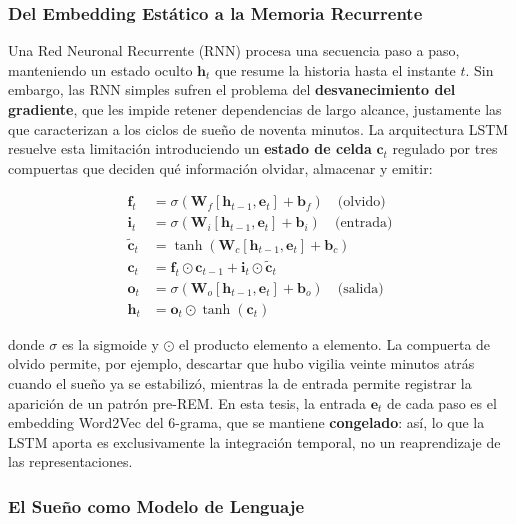 \subsubsection{Del Embedding Estático a la Memoria Recurrente}

Una Red Neuronal Recurrente (RNN) procesa una secuencia paso a paso, manteniendo un estado oculto $\mathbf{h}_t$ que resume la historia hasta el instante $t$. Sin embargo, las RNN simples sufren el problema del \textbf{desvanecimiento del gradiente}, que les impide retener dependencias de largo alcance, justamente las que caracterizan a los ciclos de sueño de noventa minutos. La arquitectura LSTM \cite{hochreiter1997long} resuelve esta limitación introduciendo un \textbf{estado de celda} $\mathbf{c}_t$ regulado por tres compuertas que deciden qué información olvidar, almacenar y emitir:

\begin{align}
    \mathbf{f}_t &= \sigma(\mathbf{W}_f [\mathbf{h}_{t-1}, \mathbf{e}_t] + \mathbf{b}_f) \quad \text{(olvido)} \\
    \mathbf{i}_t &= \sigma(\mathbf{W}_i [\mathbf{h}_{t-1}, \mathbf{e}_t] + \mathbf{b}_i) \quad \text{(entrada)} \\
    \tilde{\mathbf{c}}_t &= \tanh(\mathbf{W}_c [\mathbf{h}_{t-1}, \mathbf{e}_t] + \mathbf{b}_c) \\
    \mathbf{c}_t &= \mathbf{f}_t \odot \mathbf{c}_{t-1} + \mathbf{i}_t \odot \tilde{\mathbf{c}}_t \\
    \mathbf{o}_t &= \sigma(\mathbf{W}_o [\mathbf{h}_{t-1}, \mathbf{e}_t] + \mathbf{b}_o) \quad \text{(salida)} \\
    \mathbf{h}_t &= \mathbf{o}_t \odot \tanh(\mathbf{c}_t)
\end{align}

donde $\sigma$ es la sigmoide y $\odot$ el producto elemento a elemento. La compuerta de olvido permite, por ejemplo, descartar que hubo vigilia veinte minutos atrás cuando el sueño ya se estabilizó, mientras la de entrada permite registrar la aparición de un patrón pre-REM. En esta tesis, la entrada $\mathbf{e}_t$ de cada paso es el embedding Word2Vec del 6-grama, que se mantiene \textbf{congelado}: así, lo que la LSTM aporta es exclusivamente la integración temporal, no un reaprendizaje de las representaciones.

\subsubsection{El Sueño como Modelo de Lenguaje}

